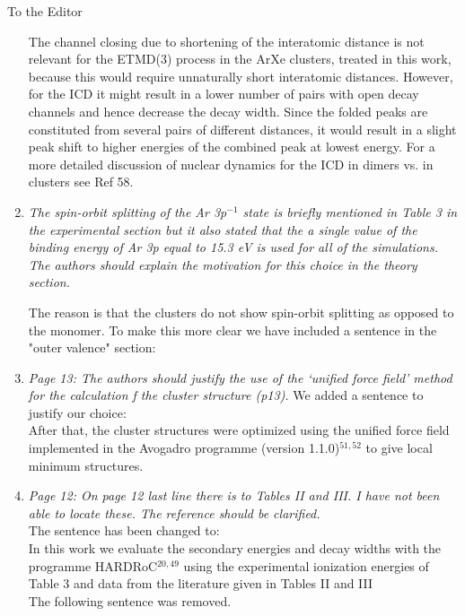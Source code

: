 \documentclass[DIN,pagenumber=false,parskip=half,fromalign=left,fromphone=true,fromemail=true,fromurl=false,fromlogo=false,fromrule=false]{scrlttr2}
\begin{document}
\begin{letter}{To the Editor}
\begin{enumerate}
{{The channel closing due to shortening of the interatomic distance is not relevant for the ETMD(3) process in the ArXe clusters, treated in this work, because this would require unnaturally short interatomic distances. However, for the ICD it might result in a lower number of pairs with open decay channels and hence decrease the decay width. Since the folded peaks are constituted from several pairs of different distances, it would result in a slight peak shift to higher energies of the combined peak at lowest energy. For a more detailed discussion of nuclear dynamics for the ICD in dimers vs. in clusters see Ref 58.}}


 \item \emph{The spin-orbit splitting of the Ar 3p$^{-1}$ state is briefly mentioned in Table 3 in the experimental section but it also stated that the a single value of the binding energy of Ar 3p equal to 15.3 eV is used for all of the simulations. The authors should explain the motivation for this choice in the theory section.}

The reason is that the clusters do not show spin-orbit splitting as opposed to the monomer. To make this more clear we have included a sentence in the "outer valence" section: {}

 \item \emph{Page 13:
       The authors should justify the use of the ‘unified force field’ method for the calculation f the cluster structure (p13).}
       We added a sentence to justify our choice:\\
       After that, the cluster structures were optimized using the unified
       force field implemented in the Avogadro programme
       (version 1.1.0)$^{51,52}$ to give local minimum structures.
       {\color{blue}{ The method
       was chosen due to its low computational cost, the possibility to find
       the next local minimum structure based on the chosen starting point
       and the necessary effort to produce reliable results with density
       functional theory (DFT) for v. d. Waals interactions since we in
       this work discuss structural trends and not absolute structures.}}

 \item \emph{Page 12:
       On page 12 last line there is to Tables II and III. I have not been able to locate these. The reference should be clarified.}\\
       The sentence has been changed to:\\
       In this work we evaluate the secondary energies and decay widths with
       the programme HARDRoC$^{20,49}$ using the experimental ionization energies
       of Table 3 and data from the literature given in Tables II and III
       {\color{blue}{of Ref. 34.}}\\
       The following sentence was removed.


\end{enumerate}
\end{letter}
\end{document}
